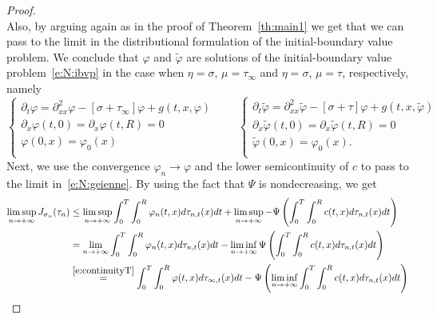 \documentclass[11pt,leqno]{amsart}
\numberwithin{equation}{section}
\begin{document}
\begin{proof}
\begin{equation}
\end{equation}
Also, by arguing again as in the proof of Theorem~\ref{th:main1} we get that we can pass to the limit in the distributional formulation of the initial-boundary value problem. We conclude that ${\varphi}$ and $\tilde {\varphi}$ are solutions of the initial-boundary value problem~\eqref{e:N:ibvp} in the case when $\eta=\sigma$, $\mu= \tau_\infty$ and 
$\eta=\sigma$, $\mu= \tau$, respectively, namely
\begin{equation}
\label{e:N:ibvp2}
  \begin{cases}
{\partial_t}  {\varphi} = {\partial_{xx}^2} {\varphi} -  [\sigma + \tau_\infty] {\varphi} + g(t,x, 
{\varphi})\\
{\partial_x } {\varphi}(t,0)={\partial_x } {\varphi}(t,R) = 0 \\
{\varphi}(0,x) = {\varphi}_0(x) \\
    \end{cases}
    \qquad 
    \begin{cases}
{\partial_t} \tilde {\varphi} = {\partial_{xx}^2} \tilde {\varphi} -  [\sigma+ \tau] {\varphi} + g(t,x, \tilde
{\varphi})\\
{\partial_x } \tilde {\varphi}(t,0)={\partial_x } \tilde {\varphi}(t,R) = 0 \\
\tilde {\varphi}(0,x) = {\varphi}_0(x). \\
    \end{cases}
\end{equation}
Next, we use the convergence ${\varphi}_n \to {\varphi}$ and the lower semicontinuity of $c$ to pass to the limit in~\eqref{e:N:geienne}. By using the fact that $\Psi$ is nondecreasing, we get 
\begin{equation}
\label{e:N:limsup}
\begin{split}
   \limsup_{n \to + \infty} J_{\sigma_n} (\tau_n) 
   & \leq  \limsup_{n \to + \infty}
   \int_0^T \int_0^R 
   {\varphi}_n (t, x) d \tau_{n,t} (x) dt + \limsup_{n \to + \infty} -
   \Psi \left( 
    \int_0^T \int_0^R 
    c (t, x) d \tau_{n,t}(x) dt \right) \\
    & = \lim_{n \to + \infty}
   \int_0^T \int_0^R 
   {\varphi}_n (t, x) d \tau_{n,t} (x) dt - \liminf_{n \to+ \infty}
    \Psi \left( 
    \int_0^T \int_0^R 
    c (t, x) d \tau_{n,t}(x) dt \right)  \\
    & \stackrel{\eqref{e:continuityT}}{=}
     \int_0^T \int_0^R 
   {\varphi} (t, x) d \tau_{\infty,t} (x) dt -
    \Psi \left(  \liminf_{n \to + \infty}
    \int_0^T \int_0^R 
    c (t, x) d \tau_{n,t}(x) dt \right)  \\  

\end{split}
\end{equation}
\end{proof}
\end{document}
